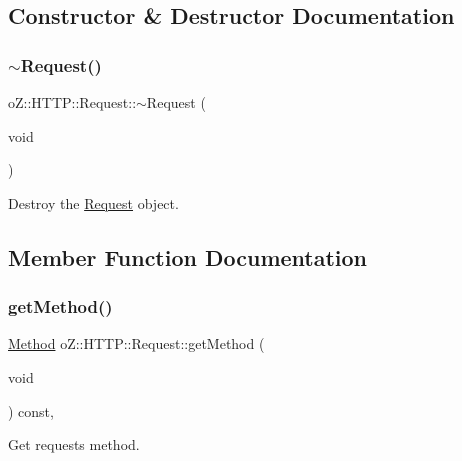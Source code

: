 \subsection{Constructor \& Destructor Documentation}
\mbox{\label{classo_z_1_1_h_t_t_p_1_1_request_a2bc2913d79ffe8ce63a19c480b9cf330}} 
\subsubsection{\texorpdfstring{$\sim$Request()}{~Request()}}
{\footnotesize\ttfamily o\+Z\+::\+H\+T\+T\+P\+::\+Request\+::$\sim$\+Request (\begin{DoxyParamCaption}\item[{void}]{ }\end{DoxyParamCaption})\hspace{0.3cm}{\ttfamily [default]}}



Destroy the \mbox{\hyperlink{classo_z_1_1_h_t_t_p_1_1_request}{Request}} object. 



\subsection{Member Function Documentation}
\mbox{\label{classo_z_1_1_h_t_t_p_1_1_request_ab8c06f60e7d3b17c2ad03c7b9cb046d7}} 
\subsubsection{\texorpdfstring{getMethod()}{getMethod()}}
{\footnotesize\ttfamily \mbox{\hyperlink{namespaceo_z_1_1_h_t_t_p_a02d8497e4abbb0adf3af0fe9fad1b7a6}{Method}} o\+Z\+::\+H\+T\+T\+P\+::\+Request\+::get\+Method (\begin{DoxyParamCaption}\item[{void}]{ }\end{DoxyParamCaption}) const\hspace{0.3cm}{\ttfamily [inline]}, {\ttfamily [noexcept]}}



Get request\textquotesingle{}s method. 

